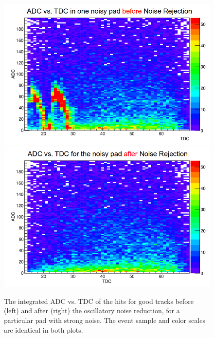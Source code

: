 \begin{figure}[tbp]
\includegraphics[scale=0.3]{fig_rtpc/noisy_pad_before_rejection.png}
\includegraphics[scale=0.3]{fig_rtpc/noisy_pad_after_rejection.png}
\caption{The integrated ADC vs. TDC of the hits for good tracks before (left) and after (right) the oscillatory noise reduction, for a particular pad with strong noise. The event sample and color scales are identical in both plots.}
\label{fig:Adcvstdcnoise}
\end{figure}

